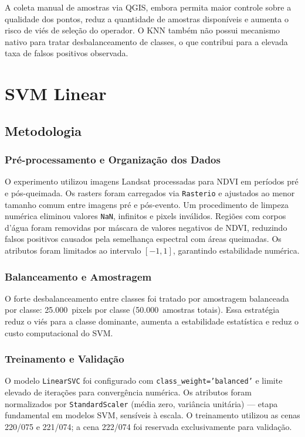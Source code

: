 \documentclass[conference]{IEEEtran}
\begin{document}
A coleta manual de amostras via QGIS, embora permita maior controle sobre
a qualidade dos pontos, reduz a quantidade de amostras disponíveis e
aumenta o risco de viés de seleção do operador. O KNN também não possui
mecanismo nativo para tratar desbalanceamento de classes, o que contribui
para a elevada taxa de falsos positivos observada.

\section{SVM Linear}

\subsection{Metodologia}

\subsubsection{Pré-processamento e Organização dos Dados}

O experimento utilizou imagens Landsat processadas para NDVI em períodos
pré e pós-queimada. Os rasters foram carregados via \texttt{Rasterio} e
ajustados ao menor tamanho comum entre imagens pré e pós-evento. Um
procedimento de limpeza numérica eliminou valores \texttt{NaN}, infinitos
e pixels inválidos. Regiões com corpos d'água foram removidas por máscara
de valores negativos de NDVI, reduzindo falsos positivos causados pela
semelhança espectral com áreas queimadas. Os atributos foram limitados
ao intervalo $[-1, 1]$, garantindo estabilidade numérica.

\subsubsection{Balanceamento e Amostragem}

O forte desbalanceamento entre classes foi tratado por amostragem
balanceada por classe: 25.000~pixels por classe (50.000~amostras totais).
Essa estratégia reduz o viés para a classe dominante, aumenta a
estabilidade estatística e reduz o custo computacional do SVM.

\subsubsection{Treinamento e Validação}

O modelo \texttt{LinearSVC} foi configurado com
\texttt{class\_weight='balanced'} e limite elevado de iterações para
convergência numérica. Os atributos foram normalizados por
\texttt{StandardScaler} (média zero, variância unitária) — etapa
fundamental em modelos SVM, sensíveis à escala. O treinamento utilizou
as cenas 220/075 e 221/074; a cena 222/074 foi reservada exclusivamente
para validação.
\end{document}
